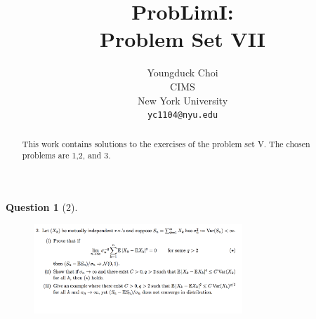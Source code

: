 \documentclass{article} %
\title{ProbLimI: \\
Problem Set VII}
\author{
Youngduck Choi \\
CIMS \\
New York University\\
\texttt{yc1104@nyu.edu} \\
}
\theoremstyle{quest}
\newtheorem*{question}{Question}
\begin{document}
\maketitle

\begin{abstract}
This work contains solutions to the exercises of the problem set V. The
chosen problems are 1,2, and 3.
\end{abstract}

\bigskip

\begin{question}[2]
\hfill
\begin{figure}[h!]
  \centering
    \includegraphics[width=0.7\textwidth]{prob-e7-p2.png}
\end{figure}
\end{question}
\end{document}
